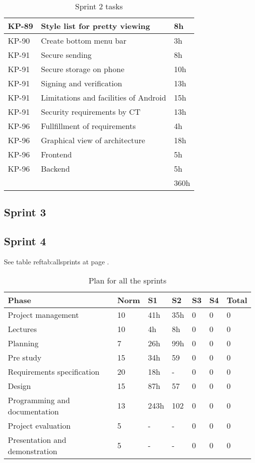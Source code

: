 \begin{table}
\begin{tabularx}{\linewidth}{>{\setlength\hsize{.2\hsize}}X|>{\setlength\hsize{1.5\hsize}}X|>{\setlength\hsize{.1\hsize}}X}
KP-89 & Style list for pretty viewing & 8h \\ \hline
KP-90 & Create bottom menu bar & 3h \\ \hline
KP-91 & Secure sending & 8h \\ \hline
KP-91 & Secure storage on phone & 10h \\ \hline
KP-91 & Signing and verification & 13h \\ \hline
KP-91 & Limitations and facilities of Android & 15h \\ \hline
KP-91 & Security requirements by CT & 13h \\ \hline
KP-96 & Fullfillment of requirements & 4h \\ \hline
KP-96 & Graphical view of architecture & 18h \\ \hline
KP-96 & Frontend & 5h \\ \hline
KP-96 & Backend & 5h \\ \hline
 &  & 360h
\end{tabularx}
\caption{Sprint 2 tasks} \label{tab:sprint2tasks}
\end{table}

\subsection{Sprint 3}

\subsection{Sprint 4}


See table ref{tab:allsprints} at page \pageref{tab:allsprints}.
\begin{table}
\begin{tabular}{l|l|l|l|l|l|l}
\textbf{Phase} &  \textbf{Norm} & \textbf{S1} & \textbf{S2}  & \textbf{S3} & \textbf{S4} & \textbf{Total} \\ \hline \hline
Project management & 10 & 41h & 35h & 0 & 0 & 0\\ \hline
Lectures & 10 & 4h & 8h & 0 & 0 & 0\\ \hline
Planning & 7 & 26h & 99h & 0 & 0 & 0\\ \hline
Pre study & 15 & 34h & 59 & 0 & 0 & 0\\ \hline
Requirements specification & 20 & 18h & - & 0 & 0 & 0\\ \hline
Design & 15 & 87h & 57 & 0 & 0 & 0\\ \hline
Programming and documentation & 13 & 243h & 102 & 0 & 0 & 0\\ \hline
Project evaluation & 5 & - & - & 0 & 0 & 0\\ \hline
Presentation and demonstration & 5 & - & - & 0 & 0 & 0
\end{tabular}
\caption{Plan for all the sprints} \label{tab:allsprints}
\end{table}

